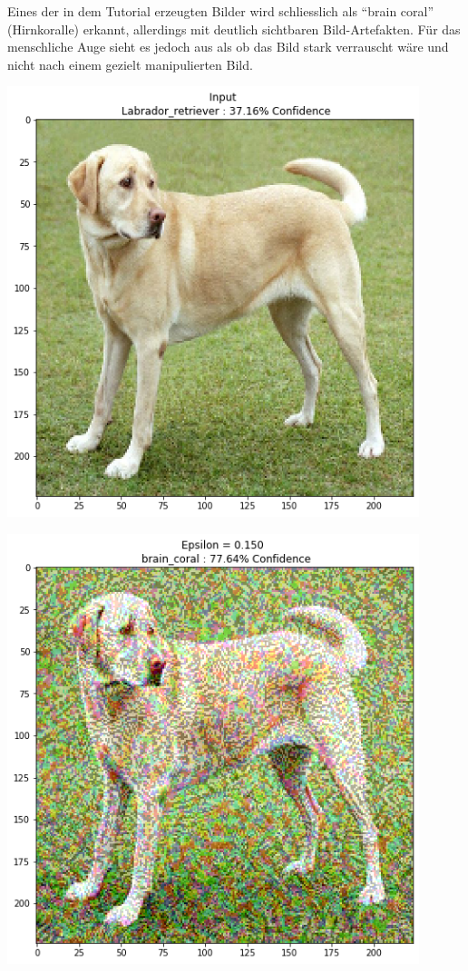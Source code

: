 \documentclass[
  12pt, %
  a4paper, %
  oneside, %
  openany, 
  numbers=noenddot, %
  BCOR=5mm, %
  parskip=half*, %
  thesis, %
]{bfhbook}
\begin{document}
Eines der in dem Tutorial erzeugten Bilder wird schliesslich als ``brain coral'' (Hirnkoralle) erkannt, allerdings mit deutlich sichtbaren Bild-Artefakten. Für das menschliche Auge sieht es jedoch aus als ob das Bild stark verrauscht wäre und nicht nach einem gezielt manipulierten Bild.
\begin{center}
\begin{minipage}[t]{0.45\linewidth}
	\vspace{0pt}
	\centering
	\includegraphics[width=0.9\textwidth]{Bilder/tensorflow-adversarial-original.png}
\end{minipage}\hfill
\begin{minipage}[t]{0.45\linewidth}
	\vspace{0pt}
	\centering
	\includegraphics[width=0.9\textwidth]{Bilder/tensorflow-adversarial-fake.png}
\end{minipage}
\end{center}
\end{document}
